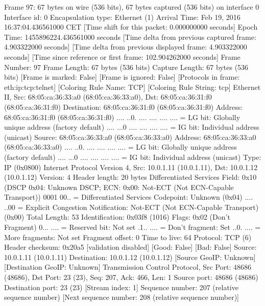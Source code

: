 Frame 97: 67 bytes on wire (536 bits), 67 bytes captured (536 bits) on interface 0
    Interface id: 0
    Encapsulation type: Ethernet (1)
    Arrival Time: Feb 19, 2016 16:37:04.436561000 CET
    [Time shift for this packet: 0.000000000 seconds]
    Epoch Time: 1455896224.436561000 seconds
    [Time delta from previous captured frame: 4.903322000 seconds]
    [Time delta from previous displayed frame: 4.903322000 seconds]
    [Time since reference or first frame: 102.904262000 seconds]
    Frame Number: 97
    Frame Length: 67 bytes (536 bits)
    Capture Length: 67 bytes (536 bits)
    [Frame is marked: False]
    [Frame is ignored: False]
    [Protocols in frame: eth:ip:tcp:telnet]
    [Coloring Rule Name: TCP]
    [Coloring Rule String: tcp]
Ethernet II, Src: 68:05:ca:36:33:a0 (68:05:ca:36:33:a0), Dst: 68:05:ca:36:31:f0 (68:05:ca:36:31:f0)
    Destination: 68:05:ca:36:31:f0 (68:05:ca:36:31:f0)
        Address: 68:05:ca:36:31:f0 (68:05:ca:36:31:f0)
        .... ..0. .... .... .... .... = LG bit: Globally unique address (factory default)
        .... ...0 .... .... .... .... = IG bit: Individual address (unicast)
    Source: 68:05:ca:36:33:a0 (68:05:ca:36:33:a0)
        Address: 68:05:ca:36:33:a0 (68:05:ca:36:33:a0)
        .... ..0. .... .... .... .... = LG bit: Globally unique address (factory default)
        .... ...0 .... .... .... .... = IG bit: Individual address (unicast)
    Type: IP (0x0800)
Internet Protocol Version 4, Src: 10.0.1.11 (10.0.1.11), Dst: 10.0.1.12 (10.0.1.12)
    Version: 4
    Header length: 20 bytes
    Differentiated Services Field: 0x10 (DSCP 0x04: Unknown DSCP; ECN: 0x00: Not-ECT (Not ECN-Capable Transport))
        0001 00.. = Differentiated Services Codepoint: Unknown (0x04)
        .... ..00 = Explicit Congestion Notification: Not-ECT (Not ECN-Capable Transport) (0x00)
    Total Length: 53
    Identification: 0x03f8 (1016)
    Flags: 0x02 (Don't Fragment)
        0... .... = Reserved bit: Not set
        .1.. .... = Don't fragment: Set
        ..0. .... = More fragments: Not set
    Fragment offset: 0
    Time to live: 64
    Protocol: TCP (6)
    Header checksum: 0x20a5 [validation disabled]
        [Good: False]
        [Bad: False]
    Source: 10.0.1.11 (10.0.1.11)
    Destination: 10.0.1.12 (10.0.1.12)
    [Source GeoIP: Unknown]
    [Destination GeoIP: Unknown]
Transmission Control Protocol, Src Port: 48686 (48686), Dst Port: 23 (23), Seq: 207, Ack: 466, Len: 1
    Source port: 48686 (48686)
    Destination port: 23 (23)
    [Stream index: 1]
    Sequence number: 207    (relative sequence number)
    [Next sequence number: 208    (relative sequence number)]
